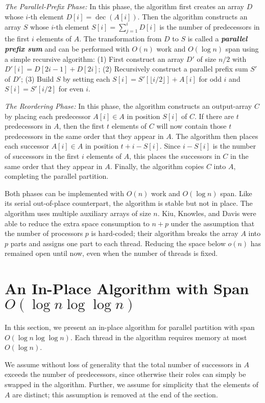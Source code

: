 \documentclass[sigplan, 10pt, nonacm]{acmart}
\newcommand{\dec}{\operatorname{dec}}
\newcommand{\defn}[1]{{\textit{\textbf{\boldmath #1}}}}
\theoremstyle{remark}
\theoremstyle{remark}
\begin{document}
\noindent\emph{The Parallel-Prefix Phase: }In this phase, the algorithm first
creates an array $D$ whose $i$-th element $D[i] = \dec(A[i])$. Then the
algorithm constructs an array $S$ whose $i$-th element $S[i] = \sum_{j = 1}^i
D[i]$ is the number of predecessors in the first $i$ elements of $A$. The
transformation from $D$ to $S$ is called a \defn{parallel prefix sum} and can
be performed with $O(n)$ work and $O(\log n)$ span using a simple recursive
algorithm: (1) First construct an array $D'$ of size $n / 2$ with $D'[i] = D[2i
- 1] + D[2i]$; (2) Recursively construct a parallel prefix sum $S'$ of $D'$;
(3) Build $S$ by setting each $S[i] = S'[\lfloor i / 2 \rfloor] + A[i]$ for odd
$i$ and $S[i] = S'[i / 2]$ for even $i$. 

\noindent\emph{The Reordering Phase: }In this phase, the algorithm constructs
an output-array $C$ by placing each predecessor $A[i] \in A$ in position $S[i]$
of $C$. If there are $t$ predecessors in $A$, then the first $t$ elements of
$C$ will now contain those $t$ predecessors in the same order that they appear
in $A$. The algorithm then places each successor $A[i] \in A$ in position $t +
i - S[i]$. Since $i - S[i]$ is the number of successors in the first $i$
elements of $A$, this places the successors in $C$ in the same order that they
appear in $A$. Finally, the algorithm copies $C$ into $A$, completing the
parallel partition.


Both phases can be implemented with $O(n)$ work and $O(\log n)$
span. Like its serial out-of-place counterpart, the algorithm is
stable but not in place. The algorithm uses multiple auxiliary arrays of
size $n$. Kiu, Knowles, and Davis \cite{LiuKn05} were able to reduce
the extra space consumption to $n + p$ under the assumption that the
number of processors $p$ is hard-coded; their algorithm breaks the
array $A$ into $p$ parts and assigns one part to each thread. Reducing
the space below $o(n)$ has remained open until now, even when the
number of threads is fixed.

\section{An In-Place Algorithm with Span $O(\log n \log \log n)$}\label{secalg}

In this section, we present an in-place algorithm for parallel
partition with span $O(\log n \log \log n)$. Each thread in the
algorithm requires memory at most $O(\log n)$.

We assume without loss of generality that the total number of
successors in $A$ exceeds the number of predecessors, since otherwise
their roles can simply be swapped in the algorithm. Further, we assume
for simplicity that the elements of $A$ are distinct; this assumption
is removed at the end of the section.
\end{document}
